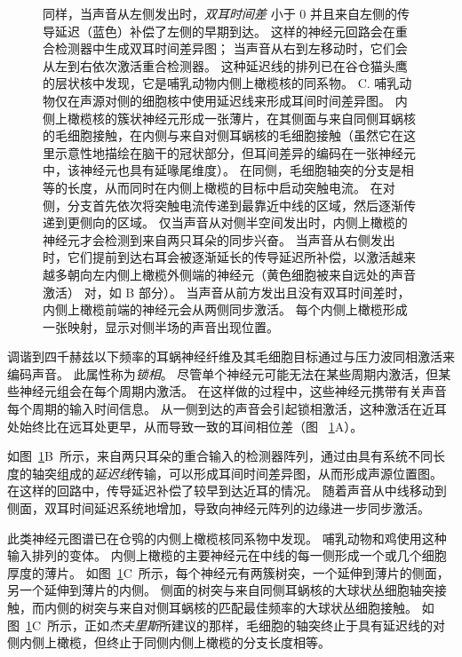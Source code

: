 \begin{figure}[htbp]
{		同样，当声音从左侧发出时，\textit{双耳时间差} 小于 0 并且来自左侧的传导延迟（蓝色）补偿了左侧的早期到达。
		这样的神经元回路会在重合检测器中生成双耳时间差异图；
		当声音从右到左移动时，它们会从左到右依次激活重合检测器。
		这种延迟线的排列已在谷仓猫头鹰的层状核中发现，它是哺乳动物内侧上橄榄核的同系物。
		C. 哺乳动物仅在声源对侧的细胞核中使用延迟线来形成耳间时间差异图。
		内侧上橄榄核的簇状神经元形成一张薄片，在其侧面与来自同侧耳蜗核的毛细胞接触，在内侧与来自对侧耳蜗核的毛细胞接触（虽然它在这里示意性地描绘在脑干的冠状部分，但耳间差异的编码在一张神经元中，该神经元也具有延喙尾维度）。
		在同侧，毛细胞轴突的分支是相等的长度，从而同时在内侧上橄榄的目标中启动突触电流。
		在对侧，分支首先依次将突触电流传递到最靠近中线的区域，然后逐渐传递到更侧向的区域。
		仅当声音从对侧半空间发出时，内侧上橄榄的神经元才会检测到来自两只耳朵的同步兴奋。
		当声音从右侧发出时，它们提前到达右耳会被逐渐延长的传导延迟所补偿，以激活越来越多朝向左内侧上橄榄外侧端的神经元（黄色细胞被来自远处的声音激活） 对，如 B 部分）。
		当声音从前方发出且没有双耳时间差时，内侧上橄榄前端的神经元会从两侧同步激活。
		每个内侧上橄榄形成一张映射，显示对侧半场的声音出现位置\cite{yin2002neural}。}
	\label{fig:28_5}
\end{figure}


调谐到四千赫兹以下频率的耳蜗神经纤维及其毛细胞目标通过与压力波同相激活来编码声音。
此属性称为\textit{锁相}。
尽管单个神经元可能无法在某些周期内激活，但某些神经元组会在每个周期内激活。
在这样做的过程中，这些神经元携带有关声音每个周期的输入时间信息。 
从一侧到达的声音会引起锁相激活，这种激活在近耳处始终比在远耳处更早，从而导致一致的耳间相位差（图 ~\ref{fig:28_5}A）。


如图~\ref{fig:28_5}B~所示，来自两只耳朵的重合输入的检测器阵列，通过由具有系统不同长度的轴突组成的\textit{延迟线}传输，可以形成耳间时间差异图，从而形成声源位置图\cite{jeffress1948place}。
在这样的回路中，传导延迟补偿了较早到达近耳的情况。
随着声音从中线移动到侧面，双耳时间延迟系统地增加，导致向神经元阵列的边缘进一步同步激活。


此类神经元图谱已在仓鸮的内侧上橄榄核同系物中发现。
哺乳动物和鸡使用这种输入排列的变体。
内侧上橄榄的主要神经元在中线的每一侧形成一个或几个细胞厚度的薄片。 
如图~\ref{fig:28_5}C~所示，每个神经元有两簇树突，一个延伸到薄片的侧面，另一个延伸到薄片的内侧。
侧面的树突与来自同侧耳蜗核的大球状丛细胞轴突接触，而内侧的树突与来自对侧耳蜗核的匹配最佳频率的大球状丛细胞接触。
如图~\ref{fig:28_5}C~所示，正如\textit{杰夫里斯}所建议的那样，毛细胞的轴突终止于具有延迟线的对侧内侧上橄榄，但终止于同侧内侧上橄榄的分支长度相等。


